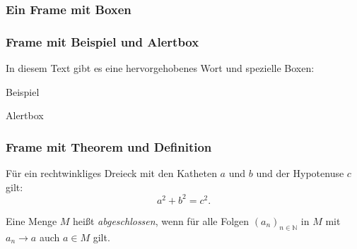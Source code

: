 \documentclass{beamer}
\begin{document}
\begin{frame}
  \frametitle{Ein Frame mit Boxen}
  \lipsum[1][5-6]

\end{frame}


\begin{frame}
  \frametitle{Frame mit Beispiel und Alertbox}

  In diesem Text gibt es eine \alert{hervorgehobenes} Wort und spezielle Boxen:
  \languagename

  \begin{exampleblock}{Beispiel}
    \lipsum[1][11-12]
  \end{exampleblock}
  \begin{alertblock}{Alertbox}
    \lipsum[1][13-14]
  \end{alertblock}
\end{frame}


\begin{frame}
  \frametitle{Frame mit Theorem und Definition}

  \begin{theorem}[Pythagoras]
    Für ein rechtwinkliges Dreieck mit den Katheten $a$ und $b$ und der Hypotenuse $c$ gilt:
    \[
      a^2 + b^2 = c^2.
    \]
  \end{theorem}

  \begin{definition}
    Eine Menge $M$ heißt \emph{abgeschlossen}, wenn für alle Folgen $(a_n)_{n\in\mathbb{N}}$ in $M$ mit $a_n\to a$ auch $a\in M$ gilt.
  \end{definition}

\end{frame}
\end{document}
